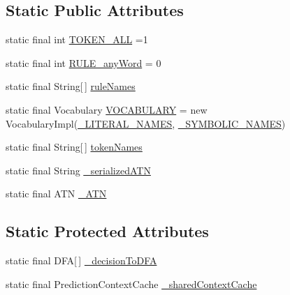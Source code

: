\subsection*{Static Public Attributes}
\begin{DoxyCompactItemize}
\item 
static final int \hyperlink{classgov_1_1nasa_1_1jpf_1_1inspector_1_1client_1_1parser_1_1_console_grammar_parser_ab726fcc8549a7dccea5cb8701b348235}{T\+O\+K\+E\+N\+\_\+\+A\+LL} =1
\item 
static final int \hyperlink{classgov_1_1nasa_1_1jpf_1_1inspector_1_1client_1_1parser_1_1_console_grammar_parser_a83d839fc36ae733f825354ca2d8dc061}{R\+U\+L\+E\+\_\+any\+Word} = 0
\item 
static final String\mbox{[}$\,$\mbox{]} \hyperlink{classgov_1_1nasa_1_1jpf_1_1inspector_1_1client_1_1parser_1_1_console_grammar_parser_ae1bd499757922a77269f2b423f9c7494}{rule\+Names}
\item 
static final Vocabulary \hyperlink{classgov_1_1nasa_1_1jpf_1_1inspector_1_1client_1_1parser_1_1_console_grammar_parser_a7b41c74d131a98a81fe94c9a9e7be972}{V\+O\+C\+A\+B\+U\+L\+A\+RY} = new Vocabulary\+Impl(\hyperlink{classgov_1_1nasa_1_1jpf_1_1inspector_1_1client_1_1parser_1_1_console_grammar_parser_a0bdc50440bf10cf36a363450d31f5d37}{\+\_\+\+L\+I\+T\+E\+R\+A\+L\+\_\+\+N\+A\+M\+ES}, \hyperlink{classgov_1_1nasa_1_1jpf_1_1inspector_1_1client_1_1parser_1_1_console_grammar_parser_abcc03573e93008f6785c7f6a74f5f332}{\+\_\+\+S\+Y\+M\+B\+O\+L\+I\+C\+\_\+\+N\+A\+M\+ES})
\item 
static final String\mbox{[}$\,$\mbox{]} \hyperlink{classgov_1_1nasa_1_1jpf_1_1inspector_1_1client_1_1parser_1_1_console_grammar_parser_ad68767244e9d95432268dbec96cd0a10}{token\+Names}
\item 
static final String \hyperlink{classgov_1_1nasa_1_1jpf_1_1inspector_1_1client_1_1parser_1_1_console_grammar_parser_a2ce69e50a570df550617bcd512552f98}{\+\_\+serialized\+A\+TN}
\item 
static final A\+TN \hyperlink{classgov_1_1nasa_1_1jpf_1_1inspector_1_1client_1_1parser_1_1_console_grammar_parser_a46eeaa0d1f85061ae721d15d137c2336}{\+\_\+\+A\+TN}
\end{DoxyCompactItemize}
\subsection*{Static Protected Attributes}
\begin{DoxyCompactItemize}
\item 
static final D\+FA\mbox{[}$\,$\mbox{]} \hyperlink{classgov_1_1nasa_1_1jpf_1_1inspector_1_1client_1_1parser_1_1_console_grammar_parser_acb7ae2e132c4bbd7a73cd47b24364a40}{\+\_\+decision\+To\+D\+FA}
\item 
static final Prediction\+Context\+Cache \hyperlink{classgov_1_1nasa_1_1jpf_1_1inspector_1_1client_1_1parser_1_1_console_grammar_parser_a45cbffe4251706d06a574bec87fa8d16}{\+\_\+shared\+Context\+Cache}
\end{DoxyCompactItemize}
